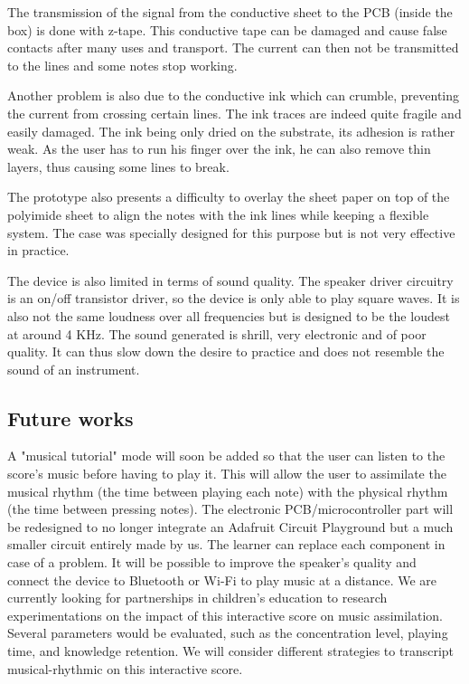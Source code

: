 The transmission of the signal from the conductive sheet to the PCB (inside the box) is done with z-tape. This conductive tape can be damaged and cause false contacts after many uses and transport. The current can then not be transmitted to the lines and some notes stop working. 

Another problem is also due to the conductive ink which can crumble, preventing the current from crossing certain lines. The ink traces are indeed quite fragile and easily damaged. The ink being only dried on the substrate, its adhesion is rather weak. As the user has to run his finger over the ink, he can also remove thin layers, thus causing some lines to break.

The prototype also presents a difficulty to overlay the sheet paper on top of the polyimide sheet to align the notes with the ink lines while keeping a flexible system. The case was specially designed for this purpose but is not very effective in practice. 

The device is also limited in terms of sound quality.
The speaker driver circuitry is an on/off transistor driver, so the device is only able to play square waves. It is also not the same loudness over all frequencies but is designed to be the loudest at around 4 KHz. The sound generated is shrill, very electronic and of poor quality. It can thus slow down the desire to practice and does not resemble the sound of an instrument.

\subsection{Future works}



A "musical tutorial" mode will soon be added so that the user can listen to the score's
music before having to play it. This will allow the user to assimilate the musical rhythm
(the time between playing each note) with the physical rhythm (the time between
pressing notes).
The electronic PCB/microcontroller part will be redesigned to no longer integrate an
Adafruit Circuit Playground but a much smaller circuit entirely made by us. The
learner can replace each component in case of a problem. It will be possible to
improve the speaker's quality and connect the device to Bluetooth or Wi-Fi to play
music at a distance.
We are currently looking for partnerships in children's education to research
experimentations on the impact of this interactive score on music assimilation. Several
parameters would be evaluated, such as the concentration level, playing time, and
knowledge retention. We will consider different strategies to transcript musical-rhythmic on this interactive score.